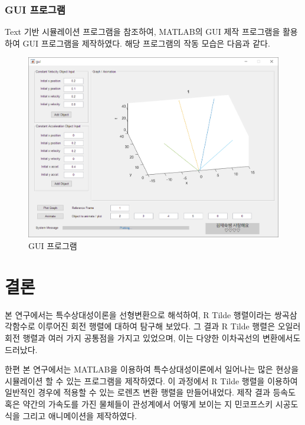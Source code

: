 \documentclass{thesis-SJ}
\begin{document}


\subsection{GUI 프로그램}
Text 기반 시뮬레이션 프로그램을 참조하여, MATLAB의 GUI 제작 프로그램을 활용하여 GUI 프로그램을 제작하였다. 해당 프로그램의 작동 모습은 다음과 같다.

\begin{figure}
	\centering
	\includegraphics[width=0.8\linewidth]{images/gui}
	\caption{GUI 프로그램}
	\label{fig:gui}
\end{figure}

\chapter{결론}
본 연구에서는 특수상대성이론을 선형변환으로 해석하여, R Tilde 행렬이라는 쌍곡삼각함수로 이루어진 회전 행렬에 대하여 탐구해 보았다. 그 결과 R Tilde 행렬은 오일러 회전 행렬과 여러 가지 공통점을 가지고 있었으며, 이는 다양한 이차곡선의 변환에서도 드러났다.

한편 본 연구에서는 MATLAB을 이용하여 특수상대성이론에서 일어나는 많은 현상을 시뮬레이션 할 수 있는 프로그램을 제작하였다. 이 과정에서 R Tilde 행렬을 이용하여 일반적인 경우에 적용할 수 있는 로렌츠 변환 행렬을 만들어내었다. 제작 결과 등속도 혹은 약간의 가속도를 가진 물체들이 관성계에서 어떻게 보이는 지 민코프스키 시공도식을 그리고 애니메이션을 제작하였다.
\end{document}
